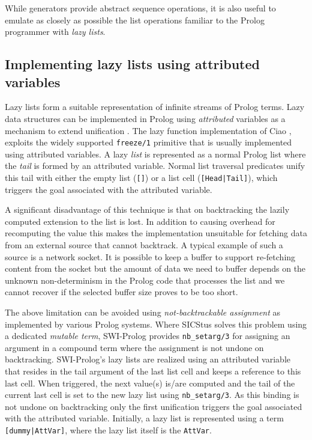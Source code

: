 \documentclass{new_tlp}
\begin{document}
While generators provide abstract sequence operations, it is also useful
to emulate as closely as possible the  list operations familiar to the 
Prolog programmer with {\em lazy lists}.

\subsection{Implementing lazy lists using attributed variables}

Lazy lists form a suitable representation of infinite streams of Prolog
terms. Lazy data structures can be implemented in Prolog using
\emph{attributed} variables as a mechanism to extend unification
\cite{10.1007/3-540-55844-6_141}. The lazy function implementation of
Ciao \cite{casas2005functional,lazyCiao}, exploits the widely supported
\texttt{freeze/1} primitive that is usually implemented using attributed
variables. A lazy \emph{list} is represented as a normal Prolog list where the
\emph{tail} is formed by an attributed variable. Normal list traversal
predicates unify this tail with either the empty list (\texttt{[]}) or a
list cell (\texttt{[Head|Tail]}), which triggers the goal associated
with the attributed variable.

A significant disadvantage of this technique is that on backtracking the
lazily computed extension to the list is lost. In addition to causing
overhead for recomputing the value this makes the implementation
unsuitable for fetching data from an external source that cannot
backtrack. A typical example of such a source is a network socket. It is
possible to keep a buffer to support re-fetching content from the socket
but the amount of data we need to buffer depends on the unknown
non-determinism in the Prolog code that processes the list and we cannot
recover if the selected buffer size proves to be too short.

The above limitation can be avoided using \emph{not-backtrackable
assignment} as implemented by various Prolog systems. Where SICStus
solves this problem using a dedicated \emph{mutable term}, SWI-Prolog
provides
\texttt{nb\_setarg/3}
for assigning an argument in a compound term where the assignment is not
undone on backtracking. SWI-Prolog's lazy lists are realized using an
attributed variable that resides in the tail argument of the last list
cell and keeps a reference to this last cell. When triggered, the next
value(s) is/are computed and the tail of the current last cell is set to
the new lazy list using \texttt{nb\_setarg/3}. As this binding is not
undone on backtracking only the first unification triggers the goal
associated with the attributed variable. Initially, a lazy list is
represented using a term \texttt{[dummy|AttVar]}, where the lazy list
itself is the  \texttt{AttVar}.
\end{document}
